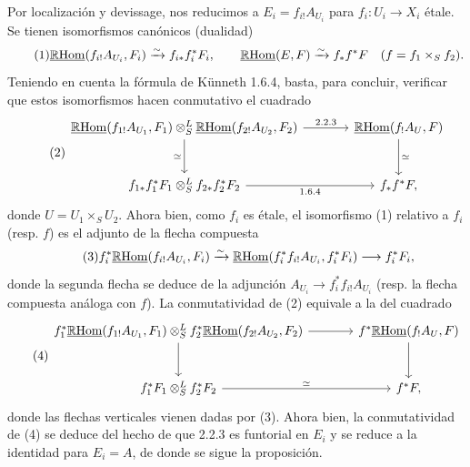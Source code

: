 Por localización y devissage, nos reducimos a $E_i=f_{i!}A_{U_i}$ para $f_i:U_i\to X_i$ étale. Se tienen isomorfismos canónicos (dualidad)
\begin{equation}\tag{1}
\underline{\mathbb{R}\mathrm{Hom}}(f_{i!}A_{U_i},F_i)\xrightarrow{\sim}f_{i*}f_i^{*}F_i,
\qquad
\underline{\mathbb{R}\mathrm{Hom}}(E,F)\xrightarrow{\sim}f_{*}f^{*}F\quad(f=f_1\times_S f_2).
\end{equation}
Teniendo en cuenta la fórmula de Künneth 1.6.4, basta, para concluir, verificar que estos isomorfismos hacen conmutativo el cuadrado
\begin{equation}\tag{2}
\begin{tikzcd}[column sep=large,row sep=large]
\uRHom(f_{1!}A_{U_1},F_1)\otimes^{L}_{S}\uRHom(f_{2!}A_{U_2},F_2) \arrow[r,"2.2.3"] \arrow[d,"\simeq"'] & \uRHom(f_{!}A_U,F) \arrow[d,"\simeq"]\\
f_{1*}f_1^{*}F_1\otimes^{L}_{S}f_{2*}f_2^{*}F_2 \arrow[r,"1.6.4"'] & f_{*}f^{*}F,
\end{tikzcd}
\end{equation}
donde $U=U_1\times_S U_2$. Ahora bien, como $f_i$ es étale, el isomorfismo (1) relativo a $f_i$ (resp. $f$) es el adjunto de la flecha compuesta
\begin{equation}\tag{3}
f_i^{*}\underline{\mathbb{R}\mathrm{Hom}}(f_{i!}A_{U_i},F_i)\xrightarrow{\sim}\underline{\mathbb{R}\mathrm{Hom}}(f_i^{*}f_{i!}A_{U_i},f_i^{*}F_i)\longrightarrow f_i^{*}F_i,
\end{equation}
donde la segunda flecha se deduce de la adjunción $A_{U_i}\to f_i^{*}f_{i!}A_{U_i}$ (resp. la flecha compuesta análoga con $f$). La conmutatividad de (2) equivale a la del cuadrado
\begin{equation}\tag{4}
\begin{tikzcd}[column sep=large,row sep=large]
f_1^{*}\uRHom(f_{1!}A_{U_1},F_1)\otimes^{L}_{S}f_2^{*}\uRHom(f_{2!}A_{U_2},F_2) \arrow[r] \arrow[d] & f^{*}\uRHom(f_{!}A_U,F) \arrow[d]\\
f_1^{*}F_1\otimes^{L}_{S}f_2^{*}F_2 \arrow[r,"\simeq"] & f^{*}F,
\end{tikzcd}
\end{equation}
donde las flechas verticales vienen dadas por (3). Ahora bien, la conmutatividad de (4) se deduce del hecho de que 2.2.3 es funtorial en $E_i$ y se reduce a la identidad para $E_i=A$, de donde se sigue la proposición.

